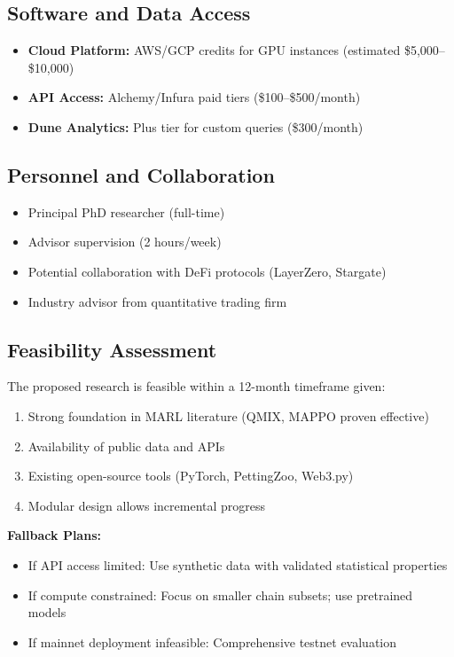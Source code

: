 \documentclass[11pt,a4paper]{article}
\begin{document}
\subsection{Software and Data Access}

\begin{itemize}[leftmargin=2em]
    \item \textbf{Cloud Platform:} AWS/GCP credits for GPU instances (estimated \$5,000--\$10,000)
    \item \textbf{API Access:} Alchemy/Infura paid tiers (\$100--\$500/month)
    \item \textbf{Dune Analytics:} Plus tier for custom queries (\$300/month)
\end{itemize}

\subsection{Personnel and Collaboration}

\begin{itemize}[leftmargin=2em]
    \item Principal PhD researcher (full-time)
    \item Advisor supervision (2 hours/week)
    \item Potential collaboration with DeFi protocols (LayerZero, Stargate)
    \item Industry advisor from quantitative trading firm
\end{itemize}

\subsection{Feasibility Assessment}

The proposed research is feasible within a 12-month timeframe given:
\begin{enumerate}[leftmargin=2em]
    \item Strong foundation in MARL literature (QMIX, MAPPO proven effective)
    \item Availability of public data and APIs
    \item Existing open-source tools (PyTorch, PettingZoo, Web3.py)
    \item Modular design allows incremental progress
\end{enumerate}

\textbf{Fallback Plans:}
\begin{itemize}[leftmargin=2em]
    \item If API access limited: Use synthetic data with validated statistical properties
    \item If compute constrained: Focus on smaller chain subsets; use pretrained models
    \item If mainnet deployment infeasible: Comprehensive testnet evaluation
\end{itemize}
\end{document}
